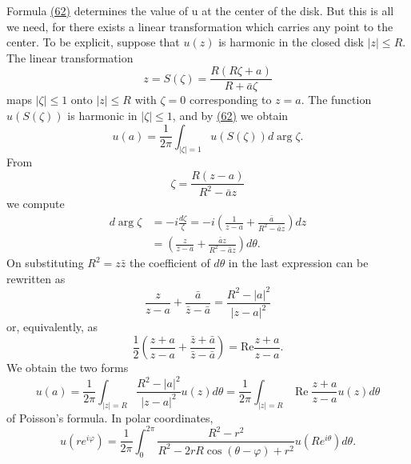 Formula \hyperref[eq:4.62]{(62)} determines the value of u at the center of the disk. But this is all we need, for there exists a linear transformation which carries
any point to the center. To be explicit, suppose that $u(z)$ is harmonic in the closed disk $|z| \leq R$. The linear transformation
\begin{equation*}
z = S (\zeta) = \frac {R (R \zeta + a)}{R + \bar {a} \zeta}
\end{equation*}
maps $|\zeta| \leq 1$ onto $|z| \leq R$ with $\zeta = 0$ corresponding to $z = a$. The function $u(S(\zeta))$ is harmonic in $|\zeta| \leq 1$, and by \hyperref[eq:4.62]{(62)} we obtain
\begin{equation*}
u (a) = \frac {1}{2 \pi} \int_ {| \zeta | = 1} u (S (\zeta)) d \arg \zeta .
\end{equation*}
From
\begin{equation*}
\zeta = \frac {R (z - a)}{R ^ {2} - \bar {a} z}
\end{equation*}
we compute
\begin{equation*}
\begin{aligned}
d\arg\zeta&=-i\frac{d\zeta}{\zeta}
=-i\left(\frac1{z-a}+\frac{\bar a}{R^2-\bar az}\right)dz\\
&=\left(\frac z{z-a}+\frac{\bar az}{R^2-\bar az}\right)d\theta.
\end{aligned}
\end{equation*}
On substituting $R^{2} = z\bar{z}$ the coefficient of $d\theta$ in the last expression can be rewritten as
\begin{equation*}
\frac {z}{z - a} + \frac {\bar {a}}{\bar {z} - \bar {a}} = \frac {R ^ {2} - | a | ^ {2}}{| z - a | ^ {2}}
\end{equation*}
or, equivalently, as
\begin{equation*}
\frac {1}{2} \left(\frac {z + a}{z - a} + \frac {\bar {z} + \bar {a}}{\bar {z} - \bar {a}}\right) = \mathrm{Re} \frac {z + a}{z - a}.
\end{equation*}
We obtain the two forms
\begin{equation*}
u (a) = \frac {1}{2 \pi} \int_ {| z | = R} \frac {R ^ {2} - | a | ^ {2}}{| z - a | ^ {2}} u (z) d \theta = \frac {1}{2 \pi} \int_ {| z | = R} \operatorname{Re} \frac {z + a}{z - a} u (z) d \theta\tag{63}\label{eq:4.63}
\end{equation*}
of Poisson's formula. In polar coordinates,
\begin{equation*}
u (r e ^ {i \varphi}) = \frac {1}{2 \pi} \int_ {0} ^ {2 \pi} \frac {R ^ {2} - r ^ {2}}{R ^ {2} - 2 r R \cos (\theta - \varphi) + r ^ {2}} u (R e ^ {i \theta}) d \theta .
\end{equation*}
